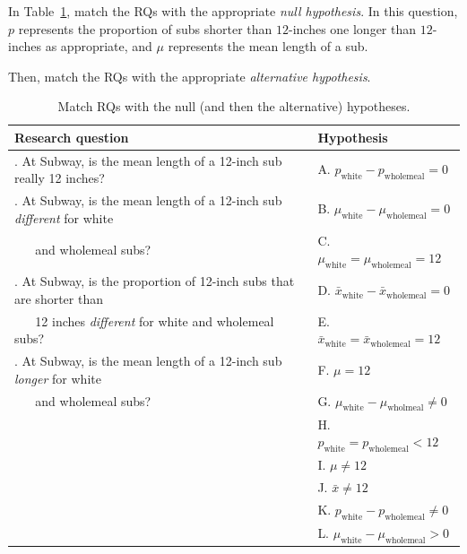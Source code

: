 \documentclass[
  11pt,
  a4paper,
  krantz2]{krantz}
\begin{document}
In Table~\ref{tab:SubwayHyp}, match the RQs with the appropriate \emph{null hypothesis}.
In this question, \(p\) represents the proportion of subs shorter than \(12\)-inches one longer than \(12\)-inches as appropriate, and \(\mu\) represents the mean length of a sub.

Then, match the RQs with the appropriate \emph{alternative hypothesis}.

\begin{table}
\centering
\caption{\label{tab:SubwayHyp}Match RQs with the null (and then the alternative) hypotheses.}
\centering
\fontsize{10}{12}\selectfont
\begin{tabular}[t]{>{\raggedright\arraybackslash}p{}>{\raggedright\arraybackslash}p{}}
\toprule
\textbf{Research question} & \textbf{Hypothesis}\\
\midrule
1. At Subway, is the mean length of a 12-inch sub really 12 inches? & A. $p_\textrm{white} - p_\textrm{wholemeal} = 0$\\
\addlinespace
2. At Subway, is the mean length of a 12-inch sub \emph{different} for white & B. $\mu_\textrm{white} - \mu_\textrm{wholemeal} = 0$\\
\addlinespace
~ ~  and wholemeal subs? & C. $\mu_\textrm{white} = \mu_\textrm{wholemeal} = 12$\\
\addlinespace
3. At Subway, is the proportion of 12-inch subs that are shorter than & D. $\bar{x}_\textrm{white} - \bar{x}_\textrm{wholemeal} = 0$\\
\addlinespace
~ ~ 12 inches \emph{different} for white and wholemeal subs? & E. $\bar{x}_\textrm{white} = \bar{x}_\textrm{wholemeal} = 12$\\
\addlinespace
4. At Subway, is the mean length of a 12-inch sub \emph{longer} for white & F. $\mu = 12$\\
\addlinespace
~ ~ and wholemeal subs? & G. $\mu_\textrm{white} - \mu_\textrm{wholmeal} \ne 0$\\
\addlinespace
 & H. $p_\textrm{white} = p_\textrm{wholemeal} < 12$\\
\addlinespace
 & I. $\mu \ne 12$\\
\addlinespace
 & J. $\bar{x} \ne 12$\\
\addlinespace
 & K. $p_\textrm{white} - p_\textrm{wholemeal} \ne 0$\\
\addlinespace
 & L. $\mu_{\text{white}} - \mu_{\text{wholemeal}} > 0$\\
\bottomrule
\end{tabular}
\end{table}
\end{document}
